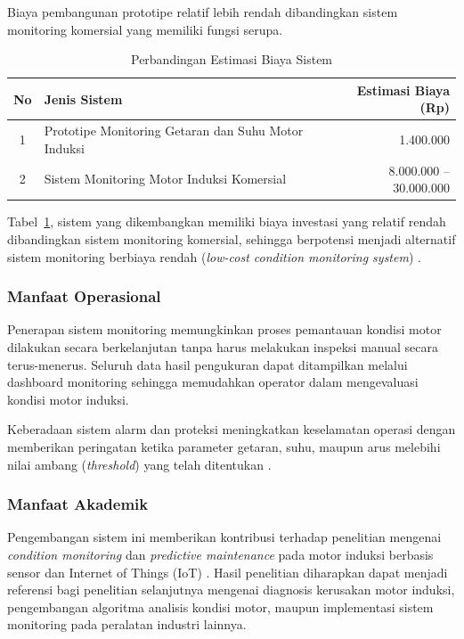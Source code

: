 \documentclass{elsinta}
\begin{document}
Biaya pembangunan prototipe relatif lebih rendah dibandingkan sistem monitoring komersial yang memiliki fungsi serupa.

\begin{table}[H]
\centering
\caption{Perbandingan Estimasi Biaya Sistem}
\label{tab:perbandingan_biaya}

\begin{tabular}{|c|p{8cm}|r|}
\hline
\textbf{No} &
\centering\textbf{Jenis Sistem} &
\textbf{Estimasi Biaya (Rp)}\\
\hline

1 &
Prototipe Monitoring Getaran dan Suhu Motor Induksi &
1.400.000\\
\hline

2 &
Sistem Monitoring Motor Induksi Komersial &
8.000.000 -- 30.000.000\\
\hline

\end{tabular}

\end{table}

Tabel~\ref{tab:perbandingan_biaya}, sistem yang dikembangkan memiliki biaya investasi yang relatif rendah dibandingkan sistem monitoring komersial, sehingga berpotensi menjadi alternatif sistem monitoring berbiaya rendah (\textit{low-cost condition monitoring system}) \cite{boardman2018}.

\subsubsection{Manfaat Operasional}

Penerapan sistem monitoring memungkinkan proses pemantauan kondisi motor dilakukan secara berkelanjutan tanpa harus melakukan inspeksi manual secara terus-menerus. Seluruh data hasil pengukuran dapat ditampilkan melalui dashboard monitoring sehingga memudahkan operator dalam mengevaluasi kondisi motor induksi.

Keberadaan sistem alarm dan proteksi meningkatkan keselamatan operasi dengan memberikan peringatan ketika parameter getaran, suhu, maupun arus melebihi nilai ambang (\textit{threshold}) yang telah ditentukan \cite{IEC60034,jardine2006}.

\subsubsection{Manfaat Akademik}

Pengembangan sistem ini memberikan kontribusi terhadap penelitian mengenai \textit{condition monitoring} dan \textit{predictive maintenance} pada motor induksi berbasis sensor dan Internet of Things (IoT) \cite{bahga2014,jardine2006}. Hasil penelitian diharapkan dapat menjadi referensi bagi penelitian selanjutnya mengenai diagnosis kerusakan motor induksi, pengembangan algoritma analisis kondisi motor, maupun implementasi sistem monitoring pada peralatan industri lainnya.
\end{document}
